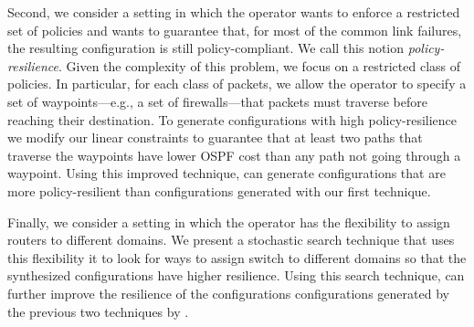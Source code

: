 Second, we consider a setting in which the operator 
wants to 
enforce a restricted set of policies and wants to guarantee
that, for most of the common link failures, the resulting configuration is still policy-compliant.
We call this notion \emph{policy-resilience}.
Given the complexity of this problem, we focus on a restricted class of policies.
In particular, for each class of packets, we allow the operator to specify a set of waypoints---e.g.,
a set of firewalls---that packets must traverse before reaching their destination.
To generate configurations with high policy-resilience 
we modify our linear constraints
to guarantee that at least two paths that traverse the waypoints
have lower OSPF cost than any path not going through a waypoint. 
Using this improved technique, \name can generate configurations that are
 more policy-resilient than configurations generated with our first technique.


Finally,  we consider a setting in which the operator has the flexibility to
assign routers to different domains.
We present a stochastic search technique that uses this flexibility it to look for
ways to assign switch to different domains so that the synthesized configurations have higher resilience.
Using this search technique, \name can further improve the resilience of the configurations 
configurations generated by the previous two techniques by
.




